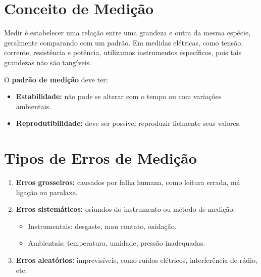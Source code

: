 \label{cap9}



\section{Conceito de Medição}
Medir é estabelecer uma relação entre uma grandeza e outra da mesma espécie, geralmente comparando com um padrão. Em medidas elétricas, como tensão, corrente, resistência e potência, utilizamos instrumentos específicos, pois tais grandezas não são tangíveis.

O \textbf{padrão de medição} deve ter:
\begin{itemize}
  \item \textbf{Estabilidade:} não pode se alterar com o tempo ou com variações ambientais.
  \item \textbf{Reprodutibilidade:} deve ser possível reproduzir fielmente seus valores.
\end{itemize}

\section{Tipos de Erros de Medição}
\begin{enumerate}
  \item \textbf{Erros grosseiros:} causados por falha humana, como leitura errada, má ligação ou paralaxe.
  \item \textbf{Erros sistemáticos:} oriundos do instrumento ou método de medição.
    \begin{itemize}
      \item Instrumentais: desgaste, mau contato, oxidação.
      \item Ambientais: temperatura, umidade, pressão inadequadas.
    \end{itemize}
  \item \textbf{Erros aleatórios:} imprevisíveis, como ruídos elétricos, interferência de rádio, etc.
\end{enumerate}

